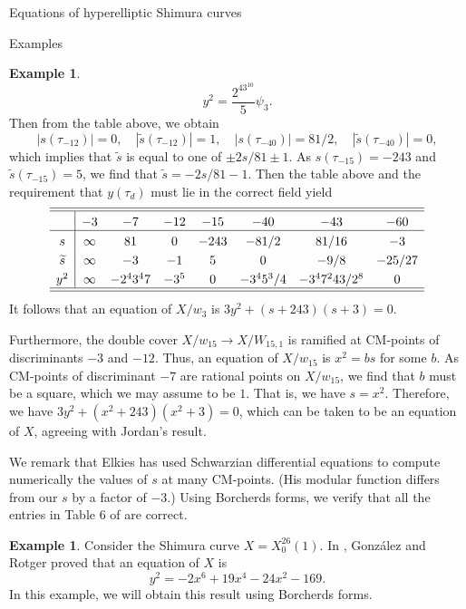 \documentclass{amsart}
\newcounter{lemma}
\theoremstyle{definition}
\newtheorem{Example}[lemma]{Example}
\def\wt{\widetilde}
\begin{document}
\begin{section}{Equations of hyperelliptic Shimura curves}
\begin{subsection}{Examples}
\begin{Example}
$$    y^2=\frac{2^43^{10}}5\psi_3.
  $$
  Then from the table above, we obtain
  $$
    |s(\tau_{-12})|=0, \quad |\wt s(\tau_{-12})|=1, \quad
    |s(\tau_{-40})|=81/2, \quad |\wt s(\tau_{-40})|=0,
  $$
  which implies that $\wt s$ is equal to one of $\pm 2s/81\pm 1$. As
  $s(\tau_{-15})=-243$ and $\wt s(\tau_{-15})=5$, we find that
  $\wt s=-2s/81-1$. Then the table above and the requirement that
  $y(\tau_d)$ must lie in the correct field yield
  $$ \extrarowheight3pt
  \begin{array}{c|ccccccc} \hline\hline
    & -3 & -7 & -12 & -15 & -40 & -43 & -60 \\ \hline
  s & \infty & 81 & 0 & -243 & -81/2 & 81/16 & -3 \\
  \wt s & \infty & -3 & -1 & 5 & 0 & -9/8 & -25/27 \\
  y^2 & \infty & -2^43^47 & -3^5 & 0 & -3^45^3/4 & -3^47^243/2^8 & 0 \\
  \hline\hline
  \end{array}
  $$
  It follows that an equation of $X/w_3$ is $3y^2+(s+243)(s+3)=0$.

  Furthermore, the double cover $X/w_{15}\to X/W_{15,1}$ is ramified
  at CM-points of discriminants $-3$ and $-12$. Thus, an equation of
  $X/w_{15}$ is $x^2=bs$ for some $b$. As CM-points of discriminant
  $-7$ are rational points on $X/w_{15}$, we find that $b$ must be a
  square, which we may assume to be $1$. That is, we have $s=x^2$.
  Therefore, we have $3y^2+(x^2+243)(x^2+3)=0$, which can be taken to
  be an equation of $X$, agreeing with Jordan's result.

  We remark that Elkies \cite{Elkies-computation} has used Schwarzian
  differential equations to compute numerically the values of $s$ at
  many CM-points. (His modular function differs from our $s$ by a factor of
  $-3$.) Using Borcherds forms, we verify that all the entries in
  Table 6 of \cite{Elkies-computation} are correct.
\end{Example}

\begin{Example} Consider the Shimura curve $X=X_0^{26}(1)$. In
  \cite{Victor-genus-two}, Gonz\'alez and Rotger proved that an
  equation of $X$ is
  $$
   y^2=-2x^6+19x^4-24x^2-169.
  $$
  In this example, we will obtain this result using Borcherds forms.


\end{Example}
\end{subsection}
\end{section}
\end{document}
